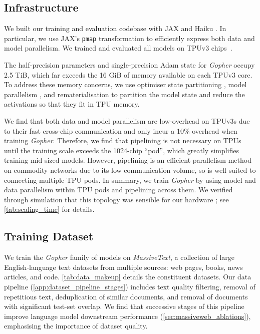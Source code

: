 \subsection{Infrastructure}
\label{method:infra}
We built our training and evaluation codebase with JAX \citep{jax2018github} and Haiku \citep{haiku2020github}. In particular, we use JAX's \texttt{pmap} transformation to efficiently express both data and model parallelism. We trained and evaluated all models on TPUv3 chips~\citep{tpuacm}.

The half-precision parameters and single-precision Adam state for \textit{Gopher} occupy 2.5 TiB, which far exceeds the 16 GiB of memory available on each TPUv3 core. To address these memory concerns, we use optimiser state partitioning \citep{rajbhandari2020zero}, model parallelism \citep{shoeybi2019megatron}, and rematerialisation \citep{griewank2000algorithm} to partition the model state and reduce the activations so that they fit in TPU memory.

We find that both data and model parallelism are low-overhead on TPUv3s due to their fast cross-chip communication and only incur a 10\% overhead when training \textit{Gopher}. Therefore, we find that pipelining \citep{huang2019gpipe} is not necessary on TPUs until the training scale exceeds the 1024-chip ``pod'', which greatly simplifies training mid-sized models. However, pipelining is an efficient parallelism method on commodity networks due to its low communication volume, so is well suited to connecting multiple TPU pods. In summary, we train \textit{Gopher} by using model and data parallelism within TPU pods and pipelining across them. We verified through simulation that this topology was sensible for our hardware \citep{automap2021}; see \autoref{tab:scaling_time} for details.

\subsection{Training Dataset}
\label{method:dataset}

We train the \textit{Gopher} family of models on \textit{MassiveText}, a collection of large English-language text datasets from multiple sources: web pages, books, news articles, and code. \autoref{tab:data_makeup} details the constituent datasets. Our data pipeline (\autoref{app:dataset_pipeline_stages}) includes text quality filtering, removal of repetitious text, deduplication of similar documents, and removal of documents with significant test-set overlap. We find that successive stages of this pipeline improve language model downstream performance (\autoref{sec:massiveweb_ablations}), emphasising the importance of dataset quality.

